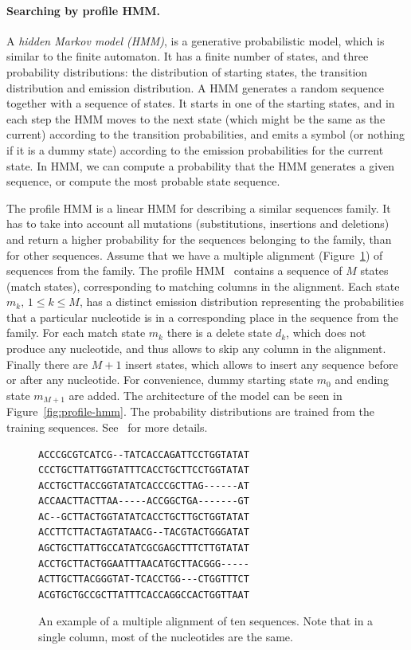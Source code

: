 \paragraph{Searching by profile HMM.}
A \emph{hidden Markov model (HMM)}, is a generative probabilistic model, which is similar to the finite automaton. It has a finite number of states, and three probability distributions: the distribution of starting states, the transition distribution and emission distribution.
A HMM generates a random sequence together with a sequence of states. It starts in one of the starting states, and in each step the HMM moves to the next state (which might be the same as the current) according to the transition probabilities, and emits a symbol (or nothing if it is a dummy state) according to the emission probabilities for the current state.
In HMM, we can compute a probability that the HMM generates a given sequence, or compute the most probable state sequence.

The profile HMM is a linear HMM for describing a similar sequences family. It has to take into account all mutations (substitutions, insertions and deletions) and return a higher probability for the sequences belonging to the family, than for other sequences.
Assume that we have a multiple alignment (Figure~\ref{fig:multiple-alignment}) of sequences from the family. The profile HMM~\cite{profile-hmm} contains a sequence of $M$ states (match states), corresponding to matching columns in the alignment. Each state $m_k,\, 1 \leq k \leq M$, has a distinct emission distribution representing the probabilities that a particular nucleotide is in a corresponding place in the sequence from the family.
For each match state $m_k$ there is a delete state $d_k$, which does not produce any nucleotide, and thus allows to skip any column in the alignment. Finally there are $M+1$ insert states, which allows to insert any sequence before or after any nucleotide. For convenience, dummy starting state $m_0$ and ending state $m_{M+1}$ are added.
The architecture of the model can be seen in Figure~\ref{fig:profile-hmm}. The probability distributions are trained from the training sequences. See~\cite{profile-hmm} for more details.

\begin{figure}[htp]
\centering
\small
\begin{BVerbatim}
ACCCGCGTCATCG--TATCACCAGATTCCTGGTATAT
CCCTGCTTATTGGTATTTCACCTGCTTCCTGGTATAT
ACCTGCTTACCGGTATATCACCCGCTTAG------AT
ACCAACTTACTTAA-----ACCGGCTGA-------GT
AC--GCTTACTGGTATATCACCTGCTTGCTGGTATAT
ACCTTCTTACTAGTATAACG--TACGTACTGGGATAT
AGCTGCTTATTGCCATATCGCGAGCTTTCTTGTATAT
ACCTGCTTACTGGAATTTAACATGCTTACGGG-----
ACTTGCTTACGGGTAT-TCACCTGG---CTGGTTTCT
ACGTGCTGCCGCTTATTTCACCAGGCCACTGGTTAAT
\end{BVerbatim}
\caption[Multiple alignment]{An example of a multiple alignment of ten sequences. Note that in a single column, most of the nucleotides are the same.}
\label{fig:multiple-alignment}
\end{figure}


